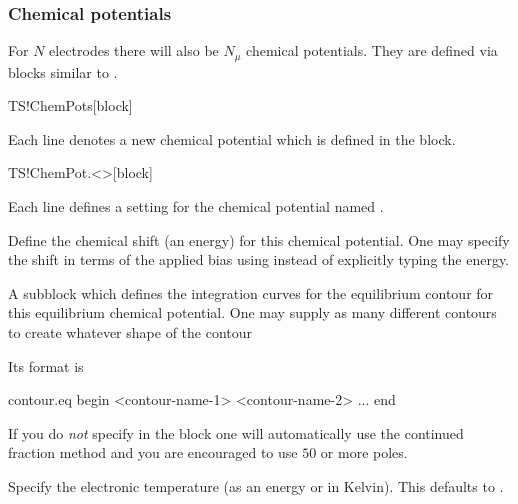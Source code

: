 \subsubsection{Chemical potentials}
\label{sec:ts:chem-pot}

For $N$ electrodes there will also be $N_\mu$ chemical
potentials. They are defined via blocks similar to .

\begin{fdfentry}{TS!ChemPots}[block]
  
  Each line denotes a new chemical potential which is defined in the
   block.
  
\end{fdfentry}

\begin{fdfentry}{TS!ChemPot.<>}[block]

  Each line defines a setting for the chemical potential named
  \fdf*{<>}.

  \begin{fdfoptions}
    

    Define the chemical shift (an energy) for this chemical
    potential. One may specify the shift in terms of the applied bias
    using  instead of explicitly typing the energy.

    \option[contour.eq]%
    A subblock which defines the integration curves for the
    equilibrium contour for this equilibrium chemical potential. One
    may supply as many different contours to create whatever shape of
    the contour
    
    Its format is
    \begin{fdfexample}
      contour.eq
       begin
        <contour-name-1>
        <contour-name-2>
        ...
       end
    \end{fdfexample}

    \note If you do \emph{not} specify  in the block
    one will automatically use the continued fraction method and you
    are encouraged to use $50$ or more poles\cite{Ozaki2010}.


    Specify the electronic temperature (as an energy or in
    Kelvin). This defaults to .


\end{fdfoptions}
\end{fdfentry}
